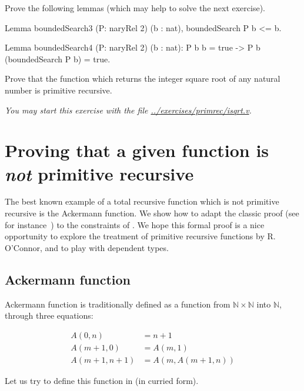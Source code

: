 \begin{exercise}
Prove the following lemmas (which may help to solve the next  exercise).

\begin{Coqsrc}
Lemma boundedSearch3 (P: naryRel 2) (b  : nat), 
    boundedSearch P b <= b. 

Lemma boundedSearch4 (P: naryRel 2) (b  : nat):
  P b b = true -> P b (boundedSearch P b) = true.
\end{Coqsrc}
\end{exercise}


\begin{exercise}
Prove that the function which returns the  integer square root of any natural number  is primitive recursive.

\emph{You may start this exercise with the file
\url{../exercises/primrec/isqrt.v}.}

\end{exercise}

\section{Proving that a given function is \emph{not} primitive recursive}
\label{sect:ack-not-PR}

The best known example of a total recursive function which is not primitive recursive is the Ackermann function. We show how to adapt the classic proof (see for instance~\cite{planetmath}) to the constraints of \gallina. We hope this formal proof 
 is a nice opportunity to explore
the treatment of primitive recursive functions by R. O'Connor,
and to play with dependent types.

\subsection{Ackermann function}



Ackermann function is traditionally defined as a function from 
$\mathbb{N}\times \mathbb{N}$ into $\mathbb{N}$, through
three equations:

\begin{align}
A(0,n)&=n+1\\
A(m+1,0)&=A(m,1)\\
A(m+1,n+1)&=A(m,A(m+1,n))
\end{align}

Let us try to define this function in \coq{} (in curried form).


